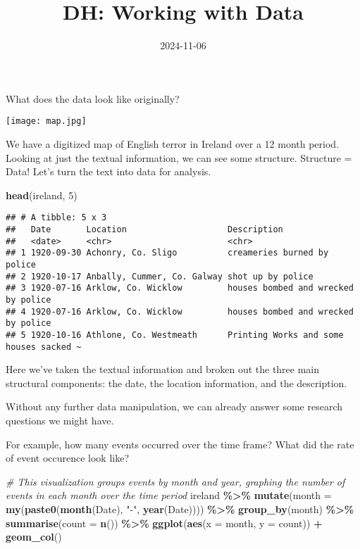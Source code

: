 \documentclass[
]{article}
\title{DH: Working with Data}
\author{}
\date{\vspace{-2.5em}2024-11-06}
\newenvironment{Shaded}{\begin{snugshade}}{\end{snugshade}}
\newcommand{\AttributeTok}[1]{\textcolor[rgb]{0.13,0.29,0.53}{#1}}
\newcommand{\CommentTok}[1]{\textcolor[rgb]{0.56,0.35,0.01}{\textit{#1}}}
\newcommand{\DecValTok}[1]{\textcolor[rgb]{0.00,0.00,0.81}{#1}}
\newcommand{\FunctionTok}[1]{\textcolor[rgb]{0.13,0.29,0.53}{\textbf{#1}}}
\newcommand{\NormalTok}[1]{#1}
\newcommand{\SpecialCharTok}[1]{\textcolor[rgb]{0.81,0.36,0.00}{\textbf{#1}}}
\newcommand{\StringTok}[1]{\textcolor[rgb]{0.31,0.60,0.02}{#1}}
\begin{document}
\maketitle

What does the data look like originally?

\texttt{[image: map.jpg]}

We have a digitized map of English terror in Ireland over a 12 month
period. Looking at just the textual information, we can see some
structure. Structure = Data! Let's turn the text into data for analysis.

\begin{Shaded}
\begin{Highlighting}[]
\FunctionTok{head}\NormalTok{(ireland, }\DecValTok{5}\NormalTok{)}
\end{Highlighting}
\end{Shaded}

\begin{verbatim}
## # A tibble: 5 x 3
##   Date       Location                    Description                            
##   <date>     <chr>                       <chr>                                  
## 1 1920-09-30 Achonry, Co. Sligo          creameries burned by police            
## 2 1920-10-17 Anbally, Cummer, Co. Galway shot up by police                      
## 3 1920-07-16 Arklow, Co. Wicklow         houses bombed and wrecked by police    
## 4 1920-07-16 Arklow, Co. Wicklow         houses bombed and wrecked by police    
## 5 1920-10-16 Athlone, Co. Westmeath      Printing Works and some houses sacked ~
\end{verbatim}

Here we've taken the textual information and broken out the three main
structural components: the date, the location information, and the
description.

Without any further data manipulation, we can already answer some
research questions we might have.

For example, how many events occurred over the time frame? What did the
rate of event occurence look like?

\begin{Shaded}
\begin{Highlighting}[]
\CommentTok{\# This visualization groups events by month and year, graphing the number of events in each month over the time period}
\NormalTok{ireland }\SpecialCharTok{\%\textgreater{}\%} \FunctionTok{mutate}\NormalTok{(}\AttributeTok{month =} \FunctionTok{my}\NormalTok{(}\FunctionTok{paste0}\NormalTok{(}\FunctionTok{month}\NormalTok{(Date), }\StringTok{"{-}"}\NormalTok{, }\FunctionTok{year}\NormalTok{(Date)))) }\SpecialCharTok{\%\textgreater{}\%}
  \FunctionTok{group\_by}\NormalTok{(month) }\SpecialCharTok{\%\textgreater{}\%} \FunctionTok{summarise}\NormalTok{(}\AttributeTok{count =} \FunctionTok{n}\NormalTok{()) }\SpecialCharTok{\%\textgreater{}\%}
  \FunctionTok{ggplot}\NormalTok{(}\FunctionTok{aes}\NormalTok{(}\AttributeTok{x =}\NormalTok{ month, }\AttributeTok{y =}\NormalTok{ count)) }\SpecialCharTok{+} 
    \FunctionTok{geom\_col}\NormalTok{()}
\end{Highlighting}
\end{Shaded}
\end{document}
